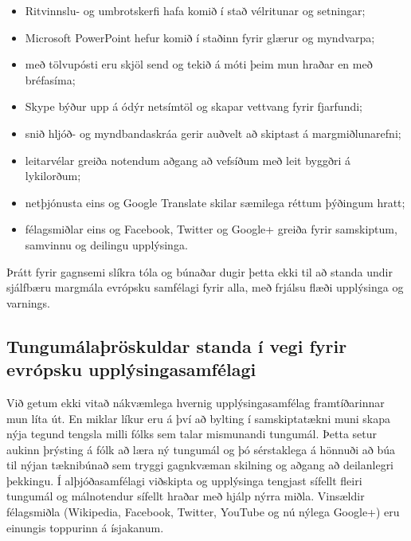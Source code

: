 \documentclass{../../metanetpaper}
\begin{document}
\begin{multicols}{2}
\begin{itemize}
\item Ritvinnslu- og umbrotskerfi hafa komið í stað vélritunar og setningar;
\item Microsoft PowerPoint hefur komið í staðinn fyrir glærur og myndvarpa;
\item með tölvupósti eru skjöl send og tekið á móti þeim mun hraðar en með bréfasíma;
\item Skype býður upp á ódýr netsímtöl og skapar vettvang fyrir fjarfundi;
\item snið hljóð- og myndbandaskráa gerir auðvelt að skiptast á margmiðlunarefni;
\item leitarvélar greiða notendum aðgang að vefsíðum með leit byggðri á lykilorðum;
\item netþjónusta eins og Google Translate skilar sæmilega réttum þýðingum hratt;
\item félagsmiðlar eins og Facebook, Twitter og Google+ greiða fyrir samskiptum, samvinnu og deilingu upplýsinga. 
\end{itemize}

Þrátt fyrir gagnsemi slíkra tóla og búnaðar dugir þetta ekki til að standa undir sjálfbæru margmála evrópsku samfélagi fyrir alla, með frjálsu flæði upplýsinga og varnings.

\subsection{Tungumálaþröskuldar standa í vegi fyrir evrópsku upplýsingasamfélagi}
  
Við getum ekki vitað nákvæmlega hvernig upplýsingasamfélag framtíðarinnar mun líta út. En miklar líkur eru á því að bylting í samskiptatækni muni skapa nýja tegund tengsla milli fólks sem talar mismunandi tungumál. Þetta setur aukinn þrýsting á fólk að læra ný tungumál og þó sérstaklega á hönnuði að búa til nýjan tæknibúnað sem tryggi gagnkvæman skilning og aðgang að deilanlegri þekkingu. Í alþjóðasamfélagi viðskipta og upplýsinga tengjast sífellt fleiri tungumál og málnotendur sífellt hraðar með hjálp nýrra miðla. Vinsældir félagsmiðla (Wikipedia, Facebook, Twitter, YouTube og nú nýlega Google+) eru einungis toppurinn á ísjakanum.



\end{multicols}
\end{document}
